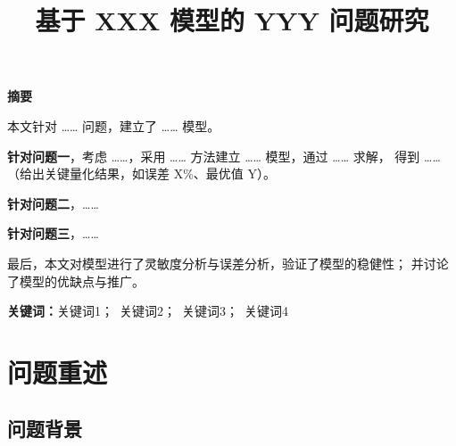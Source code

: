 \documentclass[12pt]{ctexart}
\begin{document}
\title{\textbf{基于 XXX 模型的 YYY 问题研究}}
\author{}
\date{}
\maketitle
\thispagestyle{empty}

\begin{center}\textbf{摘\quad 要}\end{center}

\noindent
本文针对 …… 问题，建立了 …… 模型。

\textbf{针对问题一}，考虑 ……，采用 …… 方法建立 …… 模型，通过 …… 求解，
得到 ……（给出关键量化结果，如误差 X\%、最优值 Y）。

\textbf{针对问题二}，……

\textbf{针对问题三}，……

最后，本文对模型进行了灵敏度分析与误差分析，验证了模型的稳健性；
并讨论了模型的优缺点与推广。

\vspace{1em}
\noindent\textbf{关键词：}\quad 关键词1；\ 关键词2；\ 关键词3；\ 关键词4

\newpage

\setcounter{tocdepth}{2}       %
\renewcommand{\contentsname}{\centerline{\zihao{4}\textbf{目\quad 录}}}
\tableofcontents
\newpage

\section{问题重述}
\subsection{问题背景}
\end{document}
